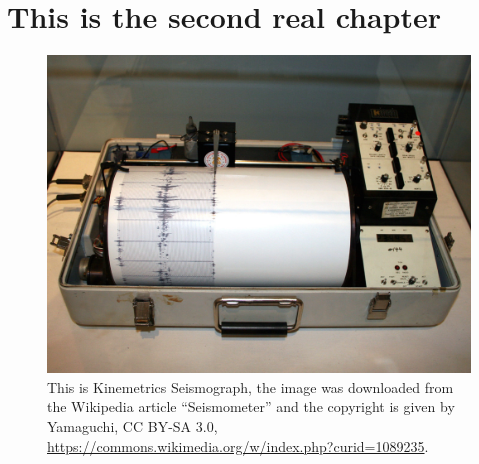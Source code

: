 \chapter{This is the second real chapter}

\lipsum[5-6]

\begin{figure}
	\includegraphics[width=\textwidth]{chapters/chapter2/figures/Kinemetrics_seismograph.jpg}
	\caption{This is Kinemetrics Seismograph, the image was downloaded from the Wikipedia article ``Seismometer'' and the copyright is given by Yamaguchi, CC BY-SA 3.0, \url{https://commons.wikimedia.org/w/index.php?curid=1089235}.}
\end{figure}

\lipsum[7-8]
